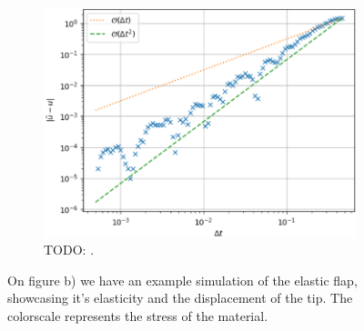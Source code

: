 \documentclass[
  english,        %
  font=times,     %
  onecolumn,      %
]{tumarticle}
\begin{document}
\begin{figure}[!ht]
    \centering
    \begin{subfigure}[b]{0.5\textwidth}
        \includegraphics[width=\textwidth]{resources/calculix_convergence_study.png}
        \caption{TODO: .}
    \end{subfigure}
    \hspace{0.8cm}
    \begin{subfigure}[b]{0.35\textwidth}
        \caption{}
    \end{subfigure}
    \caption{On figure b) we have an example simulation of the elastic flap, showcasing it's elasticity and the displacement of the tip. The colorscale represents the stress of the material.}
    \label{fig:calculix_convergence}
\end{figure}
\end{document}
